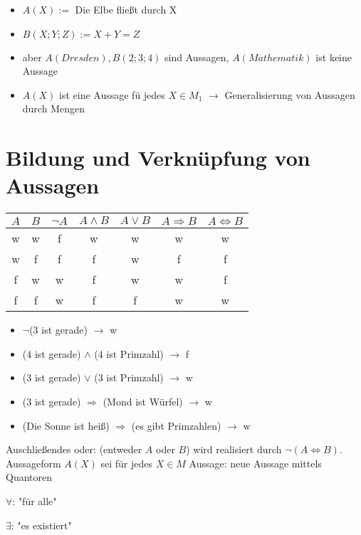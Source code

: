 \begin{exmpn}
	\begin{itemize}
		\item $A(X) := $ Die Elbe fließt durch X
		\item $B(X;Y;Z) := X + Y = Z$
		\item aber $A(Dresden) ,B(2;3;4)$ sind Aussagen, $A(Mathematik)$ ist keine Aussage
		\item $A(X)$ ist eine Aussage f\"u jedes $X \in M_1$ $\to$ Generalisierung von Aussagen durch Mengen
	\end{itemize}
\end{exmpn}

\section*{Bildung und Verknüpfung von Aussagen}

\begin{tabular}{|c|c|c|c|c|c|c|}
	\hline
	$A$ & $B$ & $\lnot A$ & $A \land B$ & $A \lor B$ & $A \Rightarrow B$ & $A \iff B$\\
	\hline
	w & w & f & w & w & w & w\\
	\hline
	w & f & f & f & w & f & f\\
	\hline
	f & w & w & f & w & w & f\\
	\hline
	f & f & w & f & f & w & w\\
	\hline
\end{tabular}

\begin{exmpn}
	\begin{itemize}
		\item $\lnot$(3 ist gerade) $\to$ w
		\item (4 ist gerade) $\land$ (4 ist Primzahl) $\to$ f
		\item (3 ist gerade) $\lor$ (3 ist Primzahl) $\to$ w
		\item (3 ist gerade) $\Rightarrow$ (Mond ist Würfel) $\to$ w
		\item (Die Sonne ist heiß) $\Rightarrow$ (es gibt Primzahlen) $\to$ w
	\end{itemize}
\end{exmpn}

\noindent Auschließendes oder: (entweder $A$ oder $B$) wird realisiert durch $\lnot(A \iff B)$.\\
Aussageform $A(X)$ sei f\"ur jedes $X \in M$ Aussage: neue Aussage mittels Quantoren

\begin{compactitem}
	\item $\forall$: "für alle"
	\item $\exists$: "es existiert"
\end{compactitem}

